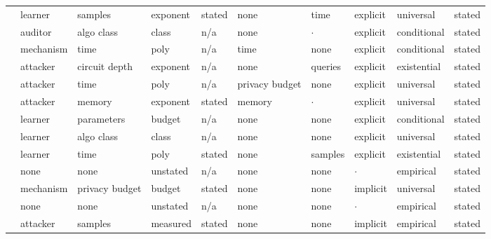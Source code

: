 \begin{landscape}
\begin{longtable}{rlllllllll}
\cite{DTAPZK24} & learner & samples & exponent & stated & none & time & explicit & universal & stated \\
\cite{HKKLMT26} & auditor & algo class & class & n/a & none & $\cdot$ & explicit & conditional & stated \\
\cite{BCV16} & mechanism & time & poly & n/a & time & none & explicit & conditional & stated \\
\cite{GM24} & attacker & circuit depth & exponent & n/a & none & queries & explicit & existential & stated \\
\cite{DP20} & attacker & time & poly & n/a & privacy budget & none & explicit & universal & stated \\
\cite{DQW21} & attacker & memory & exponent & stated & memory & $\cdot$ & explicit & universal & stated \\
\cite{BS21} & learner & parameters & budget & n/a & none & none & explicit & conditional & stated \\
\cite{KLNRS08} & learner & algo class & class & n/a & none & none & explicit & universal & stated \\
\cite{ZSWB22} & learner & time & poly & stated & none & samples & explicit & existential & stated \\
\cite{BLW25} & none & none & unstated & n/a & none & none & $\cdot$ & empirical & stated \\
\cite{SAHBS26} & mechanism & privacy budget & budget & stated & none & none & implicit & universal & stated \\
\cite{DSFHCFKSTT25} & none & none & unstated & n/a & none & none & $\cdot$ & empirical & stated \\
\cite{SE22} & attacker & samples & measured & stated & none & none & implicit & empirical & stated \\
\end{longtable}
\endgroup
\end{landscape}

